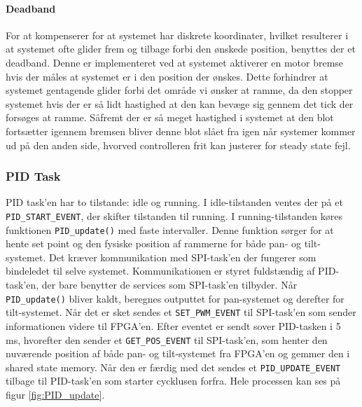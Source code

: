 \paragraph{Deadband}

For at kompenserer for at systemet har diskrete koordinater, hvilket resulterer i at systemet ofte glider frem og tilbage forbi den ønskede position, benyttes der et deadband. Denne er implementeret ved at systemet aktiverer en motor bremse hvis der måles at systemet er i den position der ønskes. Dette forhindrer at systemet gentagende glider forbi det område vi ønsker at ramme, da den stopper systemet hvis der er så lidt hastighed at den kan bevæge sig gennem det tick der forsøges at ramme. Såfremt der er så meget hastighed i systemet at den blot fortsætter igennem bremsen bliver denne blot slået fra igen når systemer kommer ud på den anden side, hvorved controlleren frit kan justerer for steady state fejl.

\subsubsection{PID Task}

PID task'en har to tilstande: idle og running. I idle-tilstanden ventes der på et \texttt{PID\_START\_EVENT}, der skifter tilstanden til running. I running-tilstanden køres funktionen \texttt{PID\_update()} med faste intervaller. Denne funktion sørger for at hente set point og den fysiske position af rammerne for både pan- og tilt-systemet. Det kræver kommunikation med SPI-task'en der fungerer som bindeledet til selve systemet. Kommunikationen er styret fuldstændig af PID-task'en, der bare benytter de services som SPI-task'en tilbyder. Når \texttt{PID\_update()} bliver kaldt, beregnes outputtet for pan-systemet og derefter for tilt-systemet. Når det er sket sendes et \texttt{SET\_PWM\_EVENT} til SPI-task'en som sender informationen videre til FPGA'en. Efter eventet er sendt sover PID-tasken i 5 ms, hvorefter den sender et \texttt{GET\_POS\_EVENT} til SPI-task'en, som henter den nuværende position af både pan- og tilt-systemet fra FPGA'en og gemmer den i shared state memory. Når den er færdig med det sendes et \texttt{PID\_UPDATE\_EVENT} tilbage til PID-task'en som starter cycklusen forfra. Hele processen kan ses på figur \ref{fig:PID_update}.

